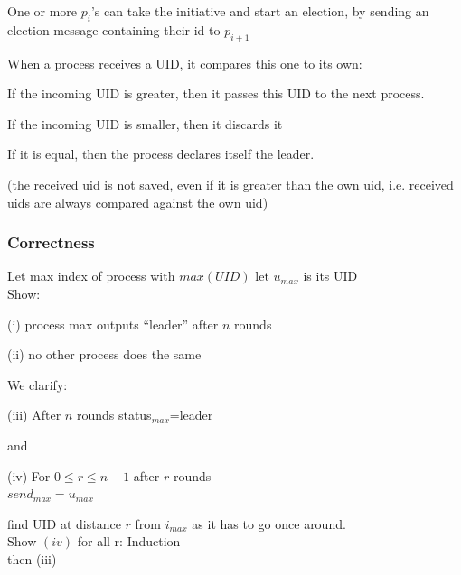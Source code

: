 \begin{compactitem}
	\item One or more $p_i$'s can take the initiative and start an election, by sending an election message containing their id to $p_{i+1}$
	\item When a process receives a UID, it compares this one to its own:
	\begin{compactitem}
		\item If the incoming UID is greater, then it passes this UID to the next process.
		\item If the incoming UID is smaller, then it discards it
		\item If it is equal, then the process declares itself the leader.
	\end{compactitem}
	\item (the received uid is not saved, even if it is greater than the own uid, i.e. received uids are always compared against the own uid)
\end{compactitem}


\subsubsection*{Correctness}
Let max index of process with $max(UID)$ let $u_{max}$ is its UID\\
Show:\\
\begin{compactitem}
\item[(i)] process max outputs ``leader'' after $n$ rounds
\item[(ii)] no other process does the same
\end{compactitem}

We clarify:\\
\begin{compactitem}
\item[(iii)] After $n$ rounds status$_{max}$=leader
\end{compactitem}
and\\
\begin{compactitem}
\item[(iv)] For $0\leq r\leq n-1$ after $r$ rounds\\
	$send_{max}=u_{max}$
\end{compactitem}
find UID at distance $r$ from $i_{max}$ as it has to go once around.\\

Show $(iv)$ for all r: Induction\\
then (iii)\\

